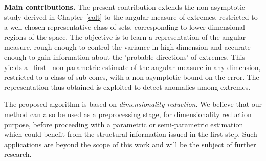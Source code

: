\noindent
\textbf{Main contributions.} The present contribution extends the non-asymptotic study derived in Chapter~\ref{colt} to the angular measure of extremes, restricted to a well-chosen representative class of sets, corresponding to lower-dimensional regions of the space. The objective is to learn a representation of the angular measure, rough enough to
control the variance in high dimension and accurate enough to gain information about the 'probable directions' of extremes. This yields a --first-- non-parametric estimate of the angular measure in any dimension, restricted to a
class of sub-cones, with a non asymptotic bound on the error. 
 The representation thus obtained is exploited to detect anomalies among extremes. 

The proposed algorithm  is based on \textit{dimensionality
  reduction}. %
We believe that our method can also be used as a preprocessing stage, for dimensionality reduction purpose, before proceeding with a parametric or semi-parametric estimation which could benefit from the structural information issued in the first step. Such applications are beyond the scope of this work and will be the subject of further research.

